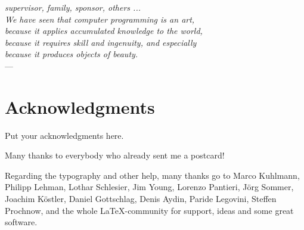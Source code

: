 \thispagestyle{empty}
\begin{flushright}{\slshape    
	supervisor, family, sponsor, others ... \\
    We have seen that computer programming is an art, \\ 
    because it applies accumulated knowledge to the world, \\ 
    because it requires skill and ingenuity, and especially \\
    because it produces objects of beauty.} \\ \medskip
    ---  \citep{knuth:1974}
\end{flushright}



\bigskip

\begingroup
\let\clearpage\relax
\let\cleardoublepage\relax
\let\cleardoublepage\relax
\section*{Acknowledgments}
Put your acknowledgments here.

Many thanks to everybody who already sent me a postcard!

Regarding the typography and other help, many thanks go to Marco 
Kuhlmann, Philipp Lehman, Lothar Schlesier, Jim Young, Lorenzo 
Pantieri, J\"org Sommer, Joachim K\"ostler, Daniel 
Gottschlag, Denis Aydin, Paride Legovini, Steffen Prochnow, 
and the whole \LaTeX-community for support, ideas and some great 
software.

\endgroup



